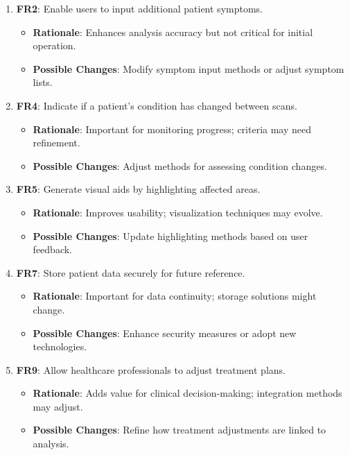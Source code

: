 \documentclass[12pt]{article}
\begin{document}
\begin{enumerate}[resume]
    \item \textbf{FR2}: Enable users to input additional patient symptoms.
    \begin{itemize}[label=-]
        \item \textbf{Rationale}: Enhances analysis accuracy but not critical for initial operation.
        \item \textbf{Possible Changes}: Modify symptom input methods or adjust symptom lists.
    \end{itemize}

    \item \textbf{FR4}: Indicate if a patient's condition has changed between scans.
    \begin{itemize}[label=-]
        \item \textbf{Rationale}: Important for monitoring progress; criteria may need refinement.
        \item \textbf{Possible Changes}: Adjust methods for assessing condition changes.
    \end{itemize}

    \item \textbf{FR5}: Generate visual aids by highlighting affected areas.
    \begin{itemize}[label=-]
        \item \textbf{Rationale}: Improves usability; visualization techniques may evolve.
        \item \textbf{Possible Changes}: Update highlighting methods based on user feedback.
    \end{itemize}

    \item \textbf{FR7}: Store patient data securely for future reference.
    \begin{itemize}[label=-]
        \item \textbf{Rationale}: Important for data continuity; storage solutions might change.
        \item \textbf{Possible Changes}: Enhance security measures or adopt new technologies.
    \end{itemize}

    \item \textbf{FR9}: Allow healthcare professionals to adjust treatment plans.
    \begin{itemize}[label=-]
        \item \textbf{Rationale}: Adds value for clinical decision-making; integration methods may adjust.
        \item \textbf{Possible Changes}: Refine how treatment adjustments are linked to analysis.
    \end{itemize}


\end{enumerate}
\end{document}
